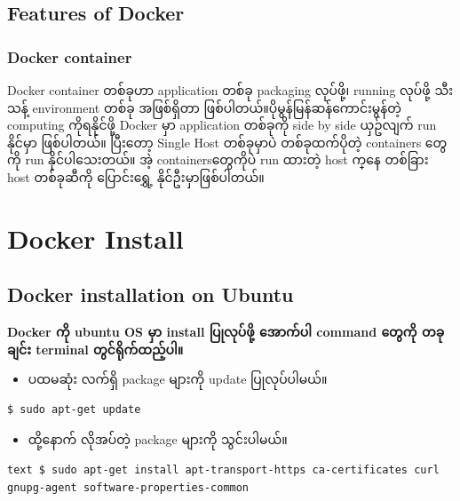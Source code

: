 \documentclass{article}
\begin{document}
\subsection{Features of Docker}\label{features-of-docker}

\subsubsection{Docker container}\label{docker-container}

Docker container တစ်ခုဟာ application တစ်ခု packaging လုပ်ဖို့၊ running
လုပ်ဖို့ သီးသန့် environment တစ်ခု အဖြစ်​ရှိ​တာ
ဖြစ်ပါတယ်။ပိုမွန်​မြန်ဆန်​ကောင်းမွန်တဲ့ computing ကိုရနိုင်ဖို့ Docker
မှာ application တစ်ခုကို side by side ယှဥ်လျက် run နိုင်မှာ ဖြစ်ပါတယ်။
ပြီး​တော့ Single Host တစ်ခုမှာပဲ တစ်ခုထက်ပိုတဲ့ containers ​တွေကို run
နိုင်ပါ​သေးတယ်။ အဲ့ containers ​တွေကိုပဲ run ထားတဲ့ host က္​နေ တစ်ခြား
host တစ်ခုဆီကို ​ပြောင်း​​ရွှေ့ နိုင်ဦးမှာဖြစ်ပါတယ်။

\pagebreak

\section{Docker Install}\label{docker-install}

\subsection{Docker installation on
Ubuntu}\label{docker-installation-on-ubuntu}

\textbf{Docker ကို ubuntu OS မှာ install ပြုလုပ်ဖို့ အောက်ပါ command
တွေကို တခုချင်း terminal တွင်ရိုက်ထည့်ပါ။}

\begin{itemize}
\itemsep1pt\parskip0pt
\item
  ပထမဆုံး လက်ရှိ package များကို update ပြုလုပ်ပါမယ်။
\end{itemize}

\begin{verbatim}
$ sudo apt-get update
\end{verbatim}

\begin{itemize}
\itemsep1pt\parskip0pt
\item
  ထို့နောက် လိုအပ်တဲ့ package များကို သွင်းပါမယ်။
\end{itemize}

\texttt{text   \$ sudo apt-get install apt-transport-https ca-certificates curl gnupg-agent software-properties-common}
\end{document}
